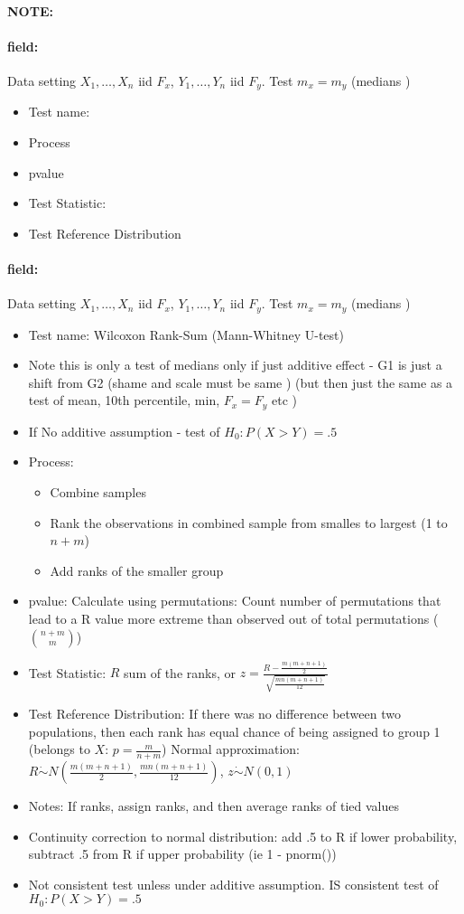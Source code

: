 \documentclass[12pt]{article}
\newenvironment{note}{\paragraph{NOTE:}}{}
\newenvironment{field}{\paragraph{field:}}{}
\begin{document}
\begin{note}
 \begin{field}
  Data setting $X_1, \ldots , X_n$ iid $F_x$, $Y_1, \ldots, Y_n$ iid $F_y$. Test $m_x = m_y$ (medians )
  \begin{itemize}
   \item Test name:
   \item Process
   \item pvalue
   \item Test Statistic:
   \item Test Reference Distribution
  \end{itemize}
 \end{field}
 \begin{field}
  Data setting $X_1, \ldots , X_n$ iid $F_x$, $Y_1, \ldots, Y_n$ iid $F_y$. Test $m_x = m_y$ (medians )
  \begin{itemize}
   \item Test name: Wilcoxon Rank-Sum (Mann-Whitney U-test)
   \item Note this is only a test of medians only if just additive effect - G1 is just a shift from G2 (shame and scale must be same ) (but then just the same as a test of mean, 10th percentile, min, $F_x = F_y$ etc )
   \item If No additive assumption - test of $H_0: P(X > Y) = .5$
   \item Process:
         \begin{itemize}
          \item Combine samples
          \item Rank the observations in combined sample from smalles to largest (1 to $n + m$)
          \item Add ranks of the smaller group
         \end{itemize}
   \item pvalue: Calculate using permutations: Count number of permutations that lead to a R value more extreme than observed out of total permutations ($\binom{n+m}{m}$)
   \item Test Statistic: $R$ sum of the ranks, or $z = \frac{R - \frac{m(m+n+1)}{2}}{\sqrt{\frac{mn(m+n+1)}{12}}}$
   \item Test Reference Distribution: If there was no difference between two populations, then each rank has equal chance of being assigned to group 1 (belongs to $X$: $p = \frac{m}{n+m}$)
         Normal approximation: $R \dot\sim N( \frac{m(m+n+1)}{2}, \frac{mn(m+n+1)}{12})$, $z \dot\sim N(0,1)$
   \item Notes: If ranks, assign ranks, and then average ranks of tied values
   \item Continuity correction to normal distribution: add .5 to R if lower probability, subtract .5 from R if upper probability (ie 1 - pnorm())
   \item Not consistent test unless under additive assumption. IS consistent test of $H_0: P(X > Y) = .5$
  \end{itemize}
 \end{field}
\end{note}
\end{document}
